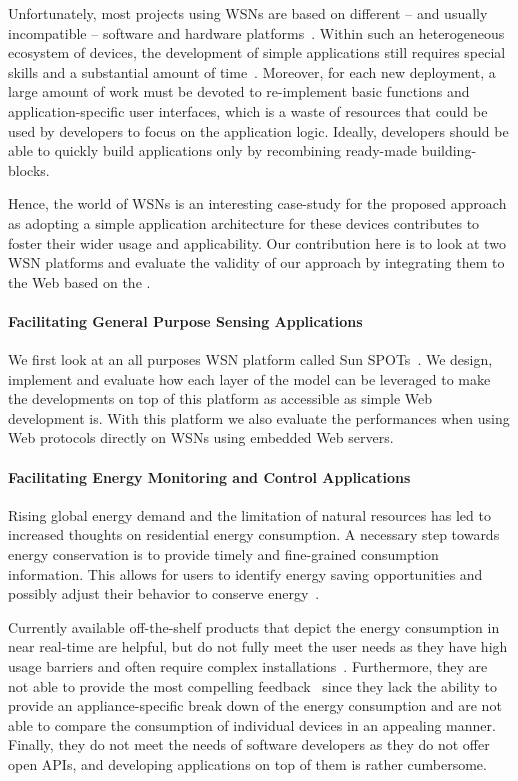 Unfortunately, most projects using WSNs are based on different -- and usually incompatible -- software and hardware platforms~\cite{DeSouza2008,Jammes2005,DeDeugd2006,Akyildiz2002}. Within such an heterogeneous ecosystem of devices, the development of simple applications still requires special skills and a substantial amount of time~\cite{Mottola2011}. Moreover, for each new deployment, a large amount of work must be devoted to re-implement basic functions and application-specific user interfaces, which is a waste of resources that could be used by developers to focus on the application logic. Ideally, developers should be able to quickly build applications only by recombining ready-made building-blocks.

Hence, the world of WSNs is an interesting case-study for the proposed approach as adopting a simple application architecture for these devices contributes to foster their wider usage and applicability. Our contribution here is to look at two WSN platforms and evaluate the validity of our approach by integrating them to the Web based on the \WoTA{}.

\paragraph{Facilitating General Purpose Sensing Applications}
We first look at an all purposes WSN platform called Sun SPOTs~. We design, implement and evaluate how each layer of the model can be leveraged to make the developments on top of this platform as accessible as simple Web development is. With this platform we also evaluate the performances when using Web protocols directly on WSNs using embedded Web servers. 

\paragraph{Facilitating Energy Monitoring and Control Applications}
Rising global energy demand and the limitation of natural resources has led to increased thoughts on residential energy consumption. A necessary step towards energy conservation is to provide timely and fine-grained consumption information. This allows for users to identify energy saving opportunities and possibly adjust their behavior to conserve energy~\cite{Mattern2010}. 

Currently available off-the-shelf products that depict the energy consumption in near real-time are helpful, but do not fully meet the user needs as they have high usage barriers and often require complex installations~\cite{Froehlich2009a}. Furthermore, they are not able to provide the most compelling feedback~\cite{Fischer2008-Energy} since they lack the ability to provide an appliance-specific break down of the energy consumption and are not able to compare the consumption of individual devices in an appealing manner. Finally, they do not meet the needs of software developers as they do not offer open APIs, and developing applications on top of them is rather cumbersome.

